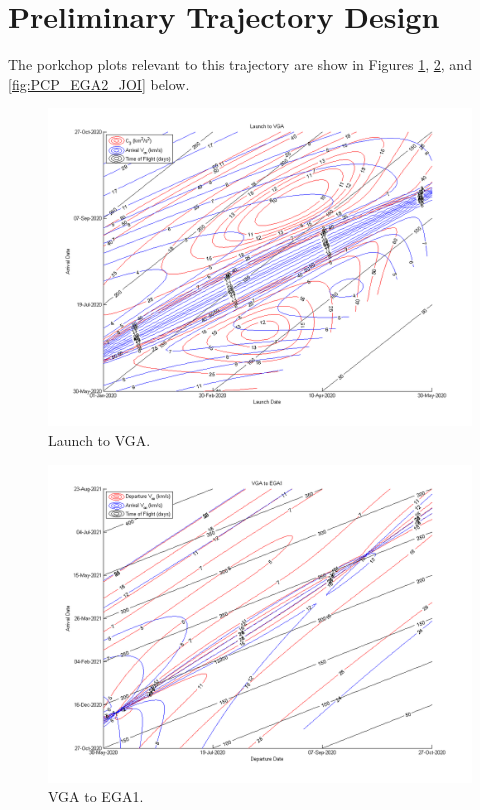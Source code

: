 \documentclass[]{aiaa-tc}%
\begin{document}
	\section{Preliminary Trajectory Design}
The porkchop plots relevant to this trajectory are show in Figures \ref{fig:PCP_Launch_VGA}, \ref{fig:PCP_VGA_EGA1}, and \ref{fig:PCP_EGA2_JOI} below.
	\begin{figure}[H]
		\centering
			\includegraphics[width = 17.5cm]{../PCP/VEEJ/1_Launch_VGA.png}
		\caption{Launch to VGA. }
		\label{fig:PCP_Launch_VGA}
	\end{figure}	

	\begin{figure}[H]
		\centering
			\includegraphics[width = 17.5cm]{../PCP/VEEJ/2_VGA_EGA1.png}
		\caption{VGA to EGA1. }
		\label{fig:PCP_VGA_EGA1}
	\end{figure}	
\end{document}
